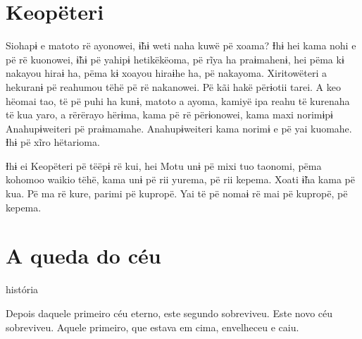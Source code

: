 \chapter{Keopëteri}

 


Siohapɨ e matoto rë ayonowei, ɨ̃hɨ weti naha kuwë pë xoama? Ɨhɨ hei kama
nohi e pë rë kuonowei, ɨ̃hɨ pë yahipɨ hetikëkëoma, pë rĩya ha praɨmahenɨ,
hei pëma kɨ nakayou hiraɨ ha, pëma kɨ xoayou hiraɨhe ha, pë nakayoma.
Xiritowëteri a hekuranɨ pë reahumou tëhë pë rë nakanowei. Pë kãi hakë
përɨotii tarei. A keo hëomai tao, të pë puhi ha kunɨ, matoto a ayoma,
kamiyë ipa reahu të kurenaha të kua yaro, a rërërayo hërɨma, kama pë rë
përɨonowei, kama maxi norimɨpɨ Anahupɨweiteri pë praɨmamahe.
Anahupɨweiteri kama norimɨ e pë yai kuomahe. Ɨhɨ pë xĩro hëtarioma. 

Ɨhɨ ei Keopëteri pë tëëpɨ rë kui, hei Motu unɨ pë mixi tuo taonomi, pëma
kohomoo waikio tëhë, kama unɨ pë rii yurema, pë rii kepema. Xoati ɨ̃ha
kama pë kua. Pë ma rë kure, parimi pë kupropë. Yai të pë nomaɨ rë mai pë
kupropë, pë kepema. 

\chapter{A queda do céu}

 história  


Depois daquele primeiro céu eterno, este segundo sobreviveu. Este novo
céu sobreviveu. Aquele primeiro, que estava em cima, envelheceu e caiu. 

